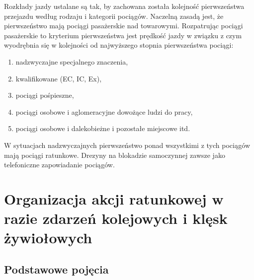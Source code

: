Rozkłady jazdy ustalane są tak, by zachowana została kolejność pierwszeństwa przejazdu według rodzaju i kategorii pociągów. 
Naczelną zasadą jest, że pierwszeństwo mają pociągi pasażerskie nad towarowymi. Rozpatrując pociągi pasażerskie to kryterium pierwszeństwa jest prędkość jazdy w związku z czym wyodrębnia się w kolejności od najwyższego stopnia pierwszeństwa pociągi: 
\begin{enumerate}
	\item nadzwyczajne specjalnego znaczenia, 
	\item kwalifikowane (EC, IC, Ex),
	\item pociągi pośpieszne,
	\item pociągi osobowe i aglomeracyjne dowożące ludzi do pracy, 
	\item pociągi osobowe i dalekobieżne i pozostałe miejscowe itd. 
\end{enumerate}
W sytuacjach nadzwyczajnych pierwszeństwo ponad wszystkimi z tych pociągów mają pociągi ratunkowe. Drezyny na blokadzie samoczynnej zawsze jako telefoniczne zapowiadanie pociągów. 

\chapter{Organizacja akcji ratunkowej w razie zdarzeń kolejowych i klęsk żywiołowych}

\section{Podstawowe pojęcia}

